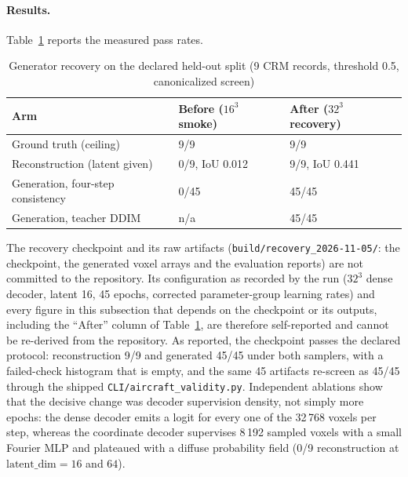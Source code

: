 \paragraph{Results.}
Table~\ref{tab:generator_recovery} reports the measured pass rates.

\begin{table}[!t]
\centering
\caption{Generator recovery on the declared held-out split (9 CRM records, threshold 0.5, canonicalized screen)}
\label{tab:generator_recovery}
\footnotesize
\setlength{\tabcolsep}{2pt}
\begin{tabular}{|p{}|p{}|p{}|}
\hline
\textbf{Arm} & \textbf{Before ($16^3$ smoke)} & \textbf{After ($32^3$ recovery)} \\ \hline
Ground truth (ceiling) & 9/9 & 9/9 \\ \hline
Reconstruction (latent given) & 0/9, IoU 0.012 & 9/9, IoU 0.441 \\ \hline
Generation, four-step consistency & 0/45 & 45/45 \\ \hline
Generation, teacher DDIM & n/a & 45/45 \\ \hline
\end{tabular}
\end{table}

The recovery checkpoint and its raw artifacts (\texttt{build/recovery\_2026-11-05/}: the
checkpoint, the generated voxel arrays and the evaluation reports) are not committed to
the repository. Its configuration as recorded by the run ($32^3$ dense decoder, latent 16,
45 epochs, corrected parameter-group learning rates) and every figure in this subsection
that depends on the checkpoint or its outputs, including the ``After'' column of
Table~\ref{tab:generator_recovery}, are therefore self-reported and cannot be re-derived
from the repository. As reported, the checkpoint passes the declared protocol: reconstruction
9/9 and generated 45/45 under both samplers, with a failed-check histogram that is
empty, and the same 45 artifacts re-screen as 45/45 through the shipped
\texttt{CLI/aircraft\_validity.py}. Independent ablations show that the decisive
change was decoder supervision density, not simply more epochs: the dense decoder
emits a logit for every one of the 32\,768 voxels per step, whereas the coordinate
decoder supervises 8\,192 sampled voxels with a small Fourier MLP and plateaued with a
diffuse probability field (0/9 reconstruction at $\text{latent\_dim}=16$ and $64$).

